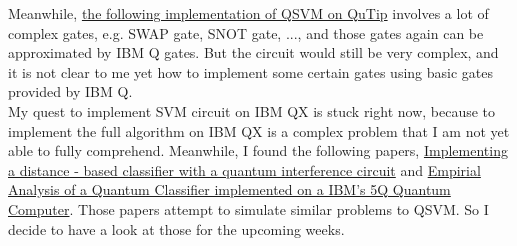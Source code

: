 \documentclass[12pt]{article}
\begin{document}
Meanwhile, \href{https://github.com/JinlongHuang/quantum-SVM/blob/master/quantum_circuit.ipynb}{the following implementation of QSVM on QuTip} involves a lot of complex gates, e.g. SWAP gate, SNOT gate, ..., and those gates again can be approximated by IBM Q gates. But the circuit would still be very complex, and it is not clear to me yet how to implement some certain gates using basic gates provided by IBM Q. \\

My quest to implement SVM circuit on IBM QX is stuck right now, because to implement the full algorithm on IBM QX is a complex problem that I am not yet able to fully comprehend. Meanwhile,  I found the following papers, \href{https://arxiv.org/pdf/1703.10793.pdf}{Implementing a distance - based classifier with a quantum interference circuit} and \href{http://file.scirp.org/pdf/JQIS_2018030614075233.pdf}{Empirial Analysis of a Quantum Classifier implemented on a IBM's 5Q Quantum Computer}. Those papers attempt to simulate similar problems to QSVM. So I decide to have a look at those for the upcoming weeks. 
\end{document}
